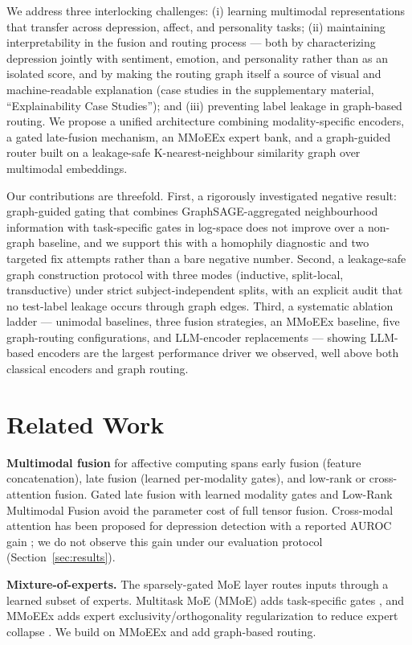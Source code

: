 \documentclass[letterpaper]{article}
\begin{document}
We address three interlocking challenges: (i) learning multimodal representations that transfer across depression, affect, and personality tasks; (ii) maintaining interpretability in the fusion and routing process — both by characterizing depression jointly with sentiment, emotion, and personality rather than as an isolated score, and by making the routing graph itself a source of visual and machine-readable explanation (case studies in the supplementary material, ``Explainability Case Studies''); and (iii) preventing label leakage in graph-based routing. We propose a unified architecture combining modality-specific encoders, a gated late-fusion mechanism, an MMoEEx expert bank, and a graph-guided router built on a leakage-safe K-nearest-neighbour similarity graph over multimodal embeddings.

Our contributions are threefold. First, a rigorously investigated negative result: graph-guided gating that combines GraphSAGE-aggregated neighbourhood information with task-specific gates in log-space does not improve over a non-graph baseline, and we support this with a homophily diagnostic and two targeted fix attempts rather than a bare negative number. Second, a leakage-safe graph construction protocol with three modes (inductive, split-local, transductive) under strict subject-independent splits, with an explicit audit that no test-label leakage occurs through graph edges. Third, a systematic ablation ladder — unimodal baselines, three fusion strategies, an MMoEEx baseline, five graph-routing configurations, and LLM-encoder replacements — showing LLM-based encoders are the largest performance driver we observed, well above both classical encoders and graph routing.

\section{Related Work}

\textbf{Multimodal fusion} for affective computing spans early fusion (feature concatenation), late fusion (learned per-modality gates), and low-rank or cross-attention fusion. Gated late fusion with learned modality gates \citep{hazdar2024gated} and Low-Rank Multimodal Fusion \citep{zadeh2017LMF} avoid the parameter cost of full tensor fusion. Cross-modal attention has been proposed for depression detection with a reported AUROC gain \citep{kim2024crossmodal}; we do not observe this gain under our evaluation protocol (Section~\ref{sec:results}).

\textbf{Mixture-of-experts.} The sparsely-gated MoE layer \citep{shazeer2017moe} routes inputs through a learned subset of experts. Multitask MoE (MMoE) adds task-specific gates \citep{ma2018model}, and MMoEEx adds expert exclusivity/orthogonality regularization to reduce expert collapse \citep{jacobs2024mmoe}. We build on MMoEEx and add graph-based routing.
\end{document}
